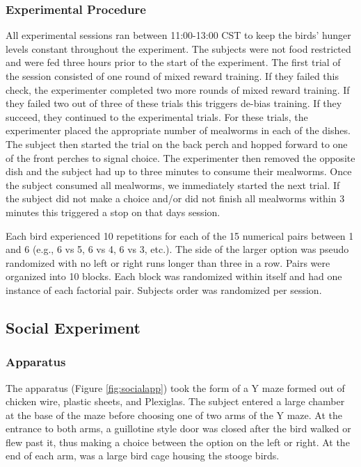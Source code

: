 \documentclass[
  ,doc,floatsintext]{apa6}
\begin{document}
\hypertarget{experimental-procedure}{%
\subsubsection{Experimental Procedure}\label{experimental-procedure}}

All experimental sessions ran between 11:00-13:00 CST to keep the birds' hunger levels constant throughout the experiment. The subjects were not food restricted and were fed three hours prior to the start of the experiment. The first trial of the session consisted of one round of mixed reward training. If they failed this check, the experimenter completed two more rounds of mixed reward training. If they failed two out of three of these trials this triggers de-bias training. If they succeed, they continued to the experimental trials. For these trials, the experimenter placed the appropriate number of mealworms in each of the dishes. The subject then started the trial on the back perch and hopped forward to one of the front perches to signal choice. The experimenter then removed the opposite dish and the subject had up to three minutes to consume their mealworms. Once the subject consumed all mealworms, we immediately started the next trial. If the subject did not make a choice and/or did not finish all mealworms within 3 minutes this triggered a stop on that days session.

Each bird experienced 10 repetitions for each of the 15 numerical pairs between 1 and 6 (e.g., 6 vs 5, 6 vs 4, 6 vs 3, etc.). The side of the larger option was pseudo randomized with no left or right runs longer than three in a row. Pairs were organized into 10 blocks. Each block was randomized within itself and had one instance of each factorial pair. Subjects order was randomized per session.

\hypertarget{social-experiment}{%
\subsection{Social Experiment}\label{social-experiment}}

\hypertarget{apparatus-1}{%
\subsubsection{Apparatus}\label{apparatus-1}}

The apparatus (Figure \ref{fig:socialapp}) took the form of a Y maze formed out of chicken wire, plastic sheets, and Plexiglas. The subject entered a large chamber at the base of the maze before choosing one of two arms of the Y maze. At the entrance to both arms, a guillotine style door was closed after the bird walked or flew past it, thus making a choice between the option on the left or right. At the end of each arm, was a large bird cage housing the stooge birds.
\end{document}
